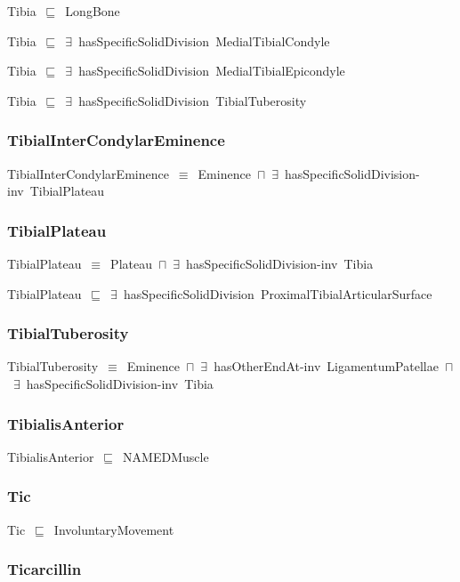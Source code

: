 \documentclass{article}
\begin{document}
Tibia~\ensuremath{\sqsubseteq}~LongBone~

Tibia~\ensuremath{\sqsubseteq}~\ensuremath{\exists}~hasSpecificSolidDivision~MedialTibialCondyle~

Tibia~\ensuremath{\sqsubseteq}~\ensuremath{\exists}~hasSpecificSolidDivision~MedialTibialEpicondyle~

Tibia~\ensuremath{\sqsubseteq}~\ensuremath{\exists}~hasSpecificSolidDivision~TibialTuberosity~

\subsubsection*{TibialInterCondylarEminence}

TibialInterCondylarEminence~\ensuremath{\equiv}~Eminence~\ensuremath{\sqcap}~\ensuremath{\exists}~hasSpecificSolidDivision-inv~TibialPlateau

\subsubsection*{TibialPlateau}

TibialPlateau~\ensuremath{\equiv}~Plateau~\ensuremath{\sqcap}~\ensuremath{\exists}~hasSpecificSolidDivision-inv~Tibia

TibialPlateau~\ensuremath{\sqsubseteq}~\ensuremath{\exists}~hasSpecificSolidDivision~ProximalTibialArticularSurface~

\subsubsection*{TibialTuberosity}

TibialTuberosity~\ensuremath{\equiv}~Eminence~\ensuremath{\sqcap}~\ensuremath{\exists}~hasOtherEndAt-inv~LigamentumPatellae~\ensuremath{\sqcap}~\ensuremath{\exists}~hasSpecificSolidDivision-inv~Tibia

\subsubsection*{TibialisAnterior}

TibialisAnterior~\ensuremath{\sqsubseteq}~NAMEDMuscle~

\subsubsection*{Tic}

Tic~\ensuremath{\sqsubseteq}~InvoluntaryMovement~

\subsubsection*{Ticarcillin}
\end{document}
